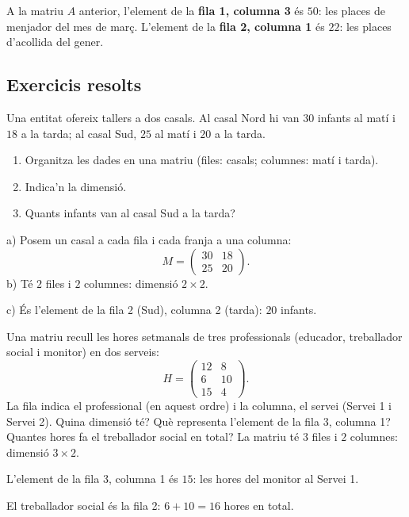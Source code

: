 \begin{exemple}
A la matriu $A$ anterior, l'element de la \textbf{fila 1, columna 3} és $50$:
les places de menjador del mes de març. L'element de la \textbf{fila 2, columna 1}
és $22$: les places d'acollida del gener.
\end{exemple}

\subsection{Exercicis resolts}

\begin{exresolt}
Una entitat ofereix tallers a dos casals. Al casal Nord hi van $30$ infants
al matí i $18$ a la tarda; al casal Sud, $25$ al matí i $20$ a la tarda.
\begin{enumerate}[label=\alph*), leftmargin=1.6em]
  \item Organitza les dades en una matriu (files: casals; columnes: matí i tarda).
  \item Indica'n la dimensió.
  \item Quants infants van al casal Sud a la tarda?
\end{enumerate}
\solucio
a) Posem un casal a cada fila i cada franja a una columna:
\[
M=\begin{pmatrix} 30 & 18 \\ 25 & 20 \end{pmatrix}.
\]
b) Té $2$ files i $2$ columnes: dimensió $2\times 2$.

c) És l'element de la fila 2 (Sud), columna 2 (tarda): $20$ infants.
\end{exresolt}

\begin{exresolt}
Una matriu recull les hores setmanals de tres professionals (educador,
treballador social i monitor) en dos serveis:
\[
H=\begin{pmatrix} 12 & 8 \\ 6 & 10 \\ 15 & 4 \end{pmatrix}.
\]
La fila indica el professional (en aquest ordre) i la columna, el servei
(Servei 1 i Servei 2). Quina dimensió té? Què representa l'element de la
fila 3, columna 1? Quantes hores fa el treballador social en total?
\solucio
La matriu té $3$ files i $2$ columnes: dimensió $3\times 2$.

L'element de la fila 3, columna 1 és $15$: les hores del monitor al Servei 1.

El treballador social és la fila 2: $6 + 10 = 16$ hores en total.
\end{exresolt}

